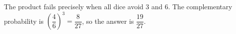 The product fails precisely when all dice avoid 3 and 6. The complementary probability is $\left(\dfrac{4}{6}\right)^3=\dfrac{8}{27}$, so the answer is $\boxed{\dfrac{19}{27}}$.
